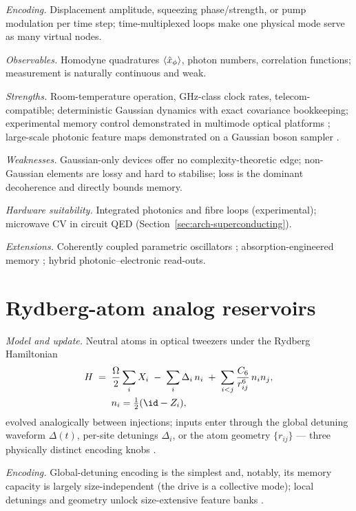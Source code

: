 \emph{Encoding.} Displacement amplitude, squeezing phase/strength, or pump
modulation per time step; time-multiplexed loops make one physical mode serve
as many virtual nodes.

\emph{Observables.} Homodyne quadratures $\langle \hat x_\phi\rangle$, photon numbers,
correlation functions; measurement is naturally continuous and weak.

\emph{Strengths.} Room-temperature operation, GHz-class clock rates,
telecom-compatible; deterministic Gaussian dynamics with exact covariance
bookkeeping; experimental memory control demonstrated in multimode optical
platforms \citep{paparelle2025experimental,garciabeni2023scalable}; large-scale
photonic feature maps demonstrated on a Gaussian boson sampler
\citep{cimini2025gaussian}.

\emph{Weaknesses.} Gaussian-only devices offer no complexity-theoretic edge;
non-Gaussian elements are lossy and hard to stabilise; loss is the dominant
decoherence and directly bounds memory.

\emph{Hardware suitability.} Integrated photonics and fibre loops
(experimental); microwave CV in circuit QED
(Section~\ref{sec:arch-superconducting}).

\emph{Extensions.} Coherently coupled parametric oscillators
\citep{dudas2023quantum}; absorption-engineered memory
\citep{gotting2025connection}; hybrid photonic--electronic read-outs.

\section{Rydberg-atom analog reservoirs}
\label{sec:arch-rydberg}

\emph{Model and update.} Neutral atoms in optical tweezers under the Rydberg
Hamiltonian
\begin{equation}
\begin{aligned}
  H \;=\;{}& \frac{\Omega}{2}\sum_i X_i \;-\; \sum_i \Delta_i\, n_i
  \;+\; \sum_{i<j} \frac{C_6}{r_{ij}^{6}}\, n_i n_j ,\\
  & n_i = \tfrac{1}{2}(\id - Z_i),
\end{aligned}
  \label{eq:rydberg}
\end{equation}
evolved analogically between injections; inputs enter through the global
detuning waveform $\Delta(t)$, per-site detunings $\Delta_i$, or the atom
geometry $\{r_{ij}\}$ --- three physically distinct encoding knobs
\citep{bravo2022quantum,kornjaca2024large}.

\emph{Encoding.} Global-detuning encoding is the simplest and, notably, its
memory capacity is largely size-independent (the drive is a collective mode);
local detunings and geometry unlock size-extensive feature banks
\citep{kornjaca2024large}.

